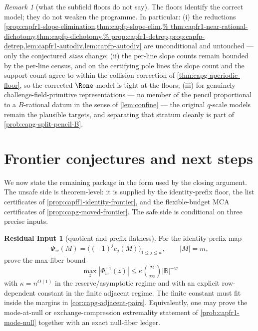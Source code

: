 \documentclass[11pt]{article}
\theoremstyle{definition}
\newtheorem{residualinput}[residualinput]{Residual Input}
\theoremstyle{remark}
\newtheorem{remark}[remark]{Remark}
\newcommand{\B}{B}
\begin{document}
\begin{remark}[what the subfield floors do not say]
\label{rem:capg-subfield-scope}
The floors identify the correct model; they do not weaken the programme.
In particular: \textup{(i)} the reductions
\cref{prop:capfr1-slope-elimination,thm:capfp-slope-elim,%
thm:capfr1-near-rational-dichotomy,thm:capfp-dichotomy,%
prop:capfr1-detrep,prop:capfp-detrep,lem:capfr1-autodiv,lem:capfp-autodiv}
are unconditional and untouched --- only the conjectured \emph{sizes}
change; \textup{(ii)} the per-line slope counts remain bounded by the
per-line census, and on the certifying pole lines the slope count and
the support count agree to within the collision correction of
\cref{thm:capg-aperiodic-floor}, so the corrected $\Rone$ model is tight
at the floors; \textup{(iii)} for genuinely challenge-field-primitive
representations --- no member of the pencil proportional to a
$\B$-rational datum in the sense of \cref{lem:confine} --- the original
$q$-scale models remain the plausible targets, and separating that
stratum cleanly is part of \cref{prob:capg-split-pencil-B}.
\end{remark}

\section{Frontier conjectures and next steps}\label{sec:frontier-next-steps}

We now state the remaining package in the form used by the closing argument.
The unsafe side is theorem-level: it is supplied by the identity-prefix floor,
the list certificates of \cref{prop:capff1-identity-frontier}, and the
flexible-budget MCA certificates of \cref{prop:capg-moved-frontier}.  The
safe side is conditional on three precise inputs.

\begin{residualinput}[quotient and prefix flatness]\label{prob:capg-active-Q}
For the identity prefix map
\[
        \Phi_w(M)=\bigl((-1)^j e_j(M)\bigr)_{1\le j\le w},
        \qquad |M|=m,
\]
prove the max-fiber bound
\[
        \max_z |\Phi_w^{-1}(z)|
        \le \kappa\binom n m |\mathbb B|^{-w}
\]
with \(\kappa=n^{O(1)}\) in the reserve/asymptotic regime and with an
explicit row-dependent constant in the finite adjacent regime.  The finite
constant must fit inside the margins in \cref{cor:capg-adjacent-pairs}.
Equivalently, one may prove the mode-at-null or exchange-compression
extremality statement of \cref{prob:capfr1-mode-null} together with an exact
null-fiber ledger.
\end{residualinput}
\end{document}
